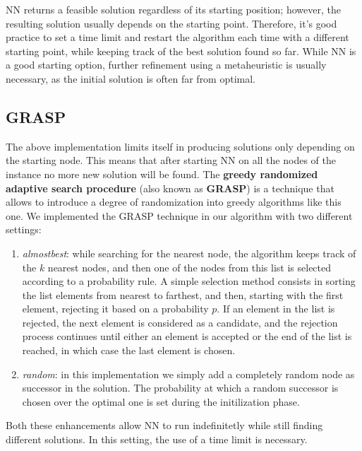 NN returns a feasible solution regardless of its starting position; however, the resulting solution usually depends on the starting point.
Therefore, it's good practice to set a time limit and restart the algorithm each time with a different starting point, while keeping track of the best solution found so far.
While NN is a good starting option, further refinement using a metaheuristic is usually necessary, as the initial solution is often far from optimal.

\subsection{GRASP}
The above implementation limits itself in producing solutions only depending on the starting node.
This means that after starting NN on all the nodes of the instance no more new solution will be found.
The \textbf{greedy randomized adaptive search procedure} (also known as \textbf{GRASP}) is a technique that allows to introduce a degree of randomization into greedy algorithms like this one.
We implemented the GRASP technique in our algorithm with two different settings:
\begin{enumerate}
    \item \textit{almostbest}: 
    while searching for the nearest node, the algorithm keeps track of the $k$ nearest nodes, and then one of the nodes from this list is selected according to a probability rule.
    A simple selection method consists in sorting the list elements from nearest to farthest, and then, starting with the first element, rejecting it based on a probability $p$.
    If an element in the list is rejected, the next element is considered as a candidate, and the rejection process continues until either an element is accepted or the end of the list is reached, in which case the last element is chosen.
    \item \textit{random}:
    in this implementation we simply add a completely random node as successor in the solution.
    The probability at which a random successor is chosen over the optimal one is set during the initilization phase.
\end{enumerate}
Both these enhancements allow NN to run indefinitetly while still finding different solutions.
In this setting, the use of a time limit is necessary.


